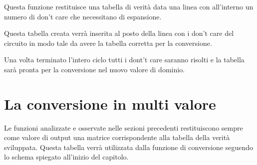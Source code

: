 \documentclass[
  italian,
]{book}
\begin{document}
Questa funzione restituisce una tabella di verità data una linea con all'interno un numero di don't care che necessitano di espansione.

Questa tabella creata verrà inserita al posto della linea con i don't care del circuito in modo tale da avere la tabella corretta per la conversione.

Una volta terminato l'intero ciclo tutti i dont't care saranno risolti e la tabella sarà pronta per la conversione nel nuovo valore di dominio.

\newpage

\hypertarget{la-conversione-in-multi-valore}{%
\section{La conversione in multi valore}\label{la-conversione-in-multi-valore}}

Le funzioni analizzate e osservate nelle sezioni precedenti restituiscono sempre come valore di output una matrice corrispondente alla tabella della verità sviluppata. Questa tabella verrà utilizzata dalla funzione di conversione seguendo lo schema spiegato all'inizio del capitolo.
\end{document}
